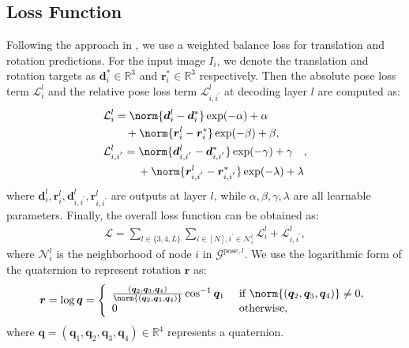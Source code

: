 \documentclass[letterpaper]{article} \usepackage{aaai23}  \usepackage{times}  \usepackage{helvet}  \usepackage{courier}  \usepackage[hyphens]{url}  \usepackage{graphicx} \urlstyle{rm} \def\UrlFont{\rm}  \usepackage{natbib}  \usepackage{caption} \frenchspacing  \setlength{\pdfpagewidth}{8.5in} \setlength{\pdfpageheight}{11in} \usepackage{booktabs}
\theoremstyle{remark}
\theoremstyle{plain}
\newcommand{\ml}[1]{\begin{multlined}[t]#1\end{multlined}}
\newcommand{\calG}{\mathcal{G}}
\newcommand{\calN}{\mathcal{N}}
\newcommand{\mbd}{\bm{d}}
\newcommand{\mbq}{\bm{q}}
\newcommand{\mbr}{\bm{r}}
\begin{document}
\subsection{Loss Function}
Following the approach in \cite{atloc}, we use a weighted balance loss for translation and rotation predictions. For the input image $I_{i}$, we denote the translation and rotation targets as $\mbd_{i}^{*} \in \mathbb{R}^{3}$ and $\mbr_{i}^{*} \in \mathbb{R}^{3}$ respectively. Then the absolute pose loss term $\mathcal{L}^{l}_{i}$ and the relative pose loss term $\mathcal{L}^{l}_{i,i^{'}}$ at decoding layer $l$ are computed as: 
\begin{align}
&\ml{\mathcal{L}^{l}_{i} = \norm{\mbd_{i}^{l}-\mbd_{i}^{*}} \exp(-\alpha) + \alpha \\
+ \norm{\mbr_{i}^{l}-\mbr_{i}^{*}} \exp(-\beta) + \beta,}\\
&\ml{\mathcal{L}^{l}_{i,i^{'}} = \norm{\mbd_{i,i^{'}}^{l}-\mbd_{i,i^{'}}^{*}} \exp(-\gamma) + \gamma \\ 
+ \norm{\mbr_{i,i^{'}}^{l}-\mbr_{i,i^{'}}^{*}} \exp(-\lambda) + \lambda},
\end{align}
where $\mbd_{i}^{l},\mbr_{i}^{l},\mbd_{i,i^{'}}^{l},\mbr_{i,i^{'}}^{l}$ are outputs at layer $l$, while $\alpha, \beta, \gamma, \lambda$ are all learnable parameters. Finally, the overall loss function can be obtained as:
\begin{align}
\mathcal{L}=\sum_{l\in\{3,4,L\}}\sum_{i
\in[N], i^{'}\in \mathcal{N}^l_i}\mathcal{L}^{l}_{i} + \mathcal{L}^{l}_{i,i^{'}},
\end{align}
where $\calN^l_i$ is the neighborhood of node $i$ in $\calG^{\mathrm{pose},l}$. We use the logarithmic form of the quaternion to represent rotation $\mbr$ as:
\begin{align}
\mbr=\log \mbq=\left\{
\begin{array}{ll}
\frac{(\mbq_{2},\mbq_{3},\mbq_{4})}{\norm{(\mbq_{2},\mbq_{3},\mbq_{4})}}\cos^{-1} \mbq_{1} &\ \text{if}\  \norm{(\mbq_{2},\mbq_{3},\mbq_{4})} \not= 0,\\
0 &\ \text{otherwise},
\end{array}
\right.
\end{align}
where $\mbq = (\mbq_{1}, \mbq_{2}, \mbq_{3}, \mbq_{4}) \in \mathbb{R}^{4}$ represents a quaternion.
\end{document}
